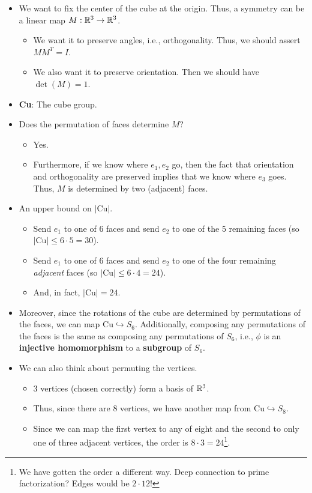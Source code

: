\documentclass[../notes.tex]{subfiles}
\begin{document}
\begin{itemize}
    \item We want to fix the center of the cube at the origin. Thus, a symmetry can be a linear map $M:\mathbb{R}^3\to\mathbb{R}^3$.
    \begin{itemize}
        \item We want it to preserve angles, i.e., orthogonality. Thus, we should assert $MM^T=I$.
        \item We also want it to preserve orientation. Then we should have $\det(M)=1$.
    \end{itemize}
    \item \textbf{Cu}: The cube group.
    \item Does the permutation of faces determine $M$?
    \begin{itemize}
        \item Yes.
        \item Furthermore, if we know where $e_1,e_2$ go, then the fact that orientation and orthogonality are preserved implies that we know where $e_3$ goes. Thus, $M$ is determined by two (adjacent) faces.
    \end{itemize}
    \item An upper bound on $|\text{Cu}|$.
    \begin{itemize}
        \item Send $e_1$ to one of 6 faces and send $e_2$ to one of the 5 remaining faces (so $|\text{Cu}|\leq 6\cdot 5=30$).
        \item Send $e_1$ to one of 6 faces and send $e_2$ to one of the four remaining \emph{adjacent} faces (so $|\text{Cu}|\leq 6\cdot 4=24$).
        \item And, in fact, $|\text{Cu}|=24$.
    \end{itemize}
    \item Moreover, since the rotations of the cube are determined by permutations of the faces, we can map $\text{Cu}\hookrightarrow S_6$. Additionally, composing any permutations of the faces is the same as composing any permutations of $S_6$, i.e., $\phi$ is an \textbf{injective homomorphism} to a \textbf{subgroup} of $S_6$.
    \item We can also think about permuting the vertices.
    \begin{itemize}
        \item 3 vertices (chosen correctly) form a basis of $\mathbb{R}^3$.
        \item Thus, since there are 8 vertices, we have another map from $\text{Cu}\hookrightarrow S_8$.
        \item Since we can map the first vertex to any of eight and the second to only one of three adjacent vertices, the order is $8\cdot 3=24$\footnote{We have gotten the order a different way. Deep connection to prime factorization? Edges would be $2\cdot 12$!}.

\end{itemize}
\end{itemize}
\end{document}
